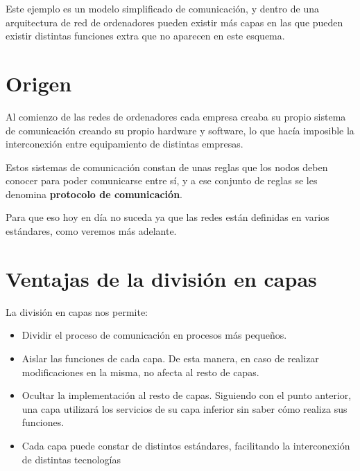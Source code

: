 Este ejemplo es un modelo simplificado de comunicación, y dentro de una arquitectura de red de ordenadores pueden existir más capas en las que pueden existir distintas funciones extra que no aparecen en este esquema.

\section{Origen}

Al comienzo de las redes de ordenadores cada empresa creaba su propio sistema de comunicación creando su propio hardware y software, lo que hacía imposible la interconexión entre equipamiento de distintas empresas.

Estos sistemas de comunicación constan de unas reglas que los nodos deben conocer para poder comunicarse entre sí, y a ese conjunto de reglas se les denomina \textbf{protocolo de comunicación}.


Para que eso hoy en día no suceda ya que las redes están definidas en varios estándares, como veremos más adelante.



\section{Ventajas de la división en capas}

La división en capas nos permite:
\begin{itemize}
    \item Dividir el proceso de comunicación en procesos más pequeños.

    \item Aislar las funciones de cada capa. De esta manera, en caso de realizar modificaciones en la misma, no afecta al resto de capas.

    \item Ocultar la implementación al resto de capas. Siguiendo con el punto anterior, una capa utilizará los servicios de su capa inferior sin saber cómo realiza sus funciones.

    \item Cada capa puede constar de distintos estándares, facilitando la interconexión de distintas tecnologías
\end{itemize}

